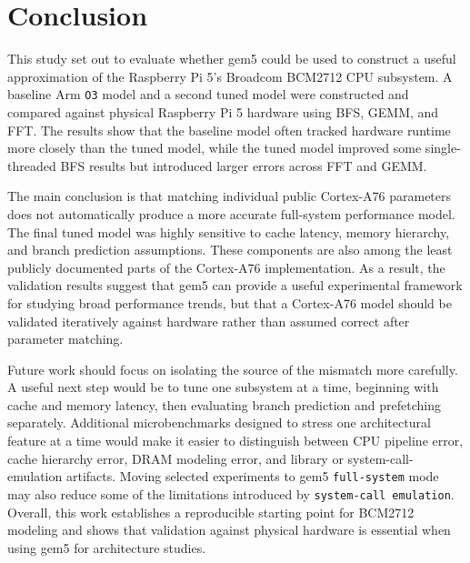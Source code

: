 \documentclass[acmlarge]{acmart}
\begin{document}
\section{Conclusion}
This study set out to evaluate whether gem5 could be used to construct a useful
approximation of the Raspberry Pi 5's Broadcom BCM2712 CPU subsystem. A baseline
Arm \texttt{O3} model and a second tuned model were constructed and compared
against physical Raspberry Pi 5 hardware using BFS, GEMM, and FFT. The results
show that the baseline model often tracked hardware runtime more closely than the
tuned model, while the tuned model improved some single-threaded BFS results but
introduced larger errors across FFT and GEMM.

The main conclusion is that matching individual public Cortex-A76 parameters does
not automatically produce a more accurate full-system performance model. The
final tuned model was highly sensitive to cache latency, memory hierarchy, and
branch prediction assumptions. These components are also among the least publicly
documented parts of the Cortex-A76 implementation. As a result, the validation
results suggest that gem5 can provide a useful experimental framework for
studying broad performance trends, but that a Cortex-A76 model should be
validated iteratively against hardware rather than assumed correct after parameter
matching.

Future work should focus on isolating the source of the mismatch more carefully.
A useful next step would be to tune one subsystem at a time, beginning with cache
and memory latency, then evaluating branch prediction and prefetching separately.
Additional microbenchmarks designed to stress one architectural feature at a time
would make it easier to distinguish between CPU pipeline error, cache hierarchy
error, DRAM modeling error, and library or system-call-emulation artifacts.
Moving selected experiments to gem5 \texttt{full-system} mode may also reduce
some of the limitations introduced by \texttt{system-call emulation}. Overall,
this work establishes a reproducible starting point for BCM2712 modeling and
shows that validation against physical hardware is essential when using gem5 for
architecture studies.



\end{document}
